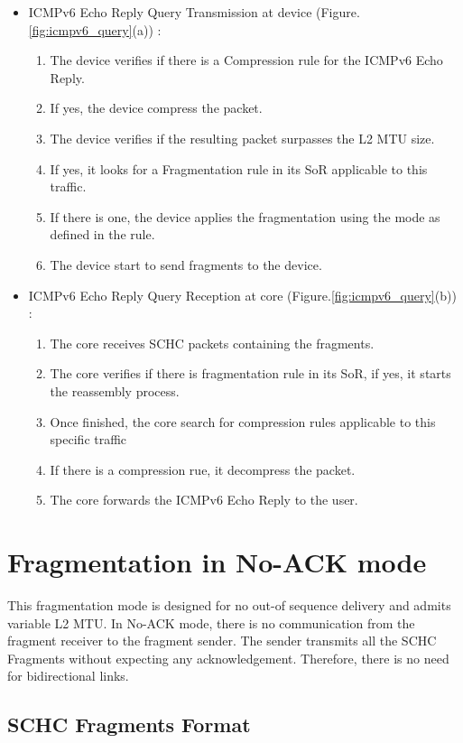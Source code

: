 \documentclass[onecolumn,12pt]{book}
\newcounter{c}
\begin{document}
\begin{itemize}
\item ICMPv6 Echo Reply Query Transmission at device (Figure.\ref{fig:icmpv6_query}(a)) : 
\begin{enumerate}
    \item The device verifies if there is a Compression rule for the ICMPv6 Echo Reply.
    \item If yes, the device compress the packet.
    \item The device verifies if the resulting packet surpasses the L2 MTU size.
    \item If yes, it looks for a Fragmentation rule in its SoR applicable to this traffic.
    \item If there is one, the device applies the fragmentation using the mode as defined in the rule.
    \item The device start to send fragments to the device.
\end{enumerate}

\item ICMPv6 Echo Reply Query Reception at core (Figure.\ref{fig:icmpv6_query}(b)) : 
\begin{enumerate}
    \item The core receives SCHC packets containing the fragments.
    \item The core verifies if there is fragmentation rule in its SoR, if yes, it starts the reassembly process.
    \item Once finished, the core search for compression rules applicable to this specific traffic 
    \item If there is a compression rue, it decompress the packet.
    \item The core forwards the ICMPv6 Echo Reply to the user.
\end{enumerate}
\end{itemize}


\section{Fragmentation in No-ACK mode}

This fragmentation mode is designed for no out-of sequence delivery and admits variable L2 MTU.
In No-ACK mode, there is no communication from the fragment receiver to the fragment sender.  
The sender transmits all the SCHC Fragments without expecting any acknowledgement.  
Therefore, there is no need for bidirectional links.

\subsection{SCHC Fragments Format}
\end{document}
